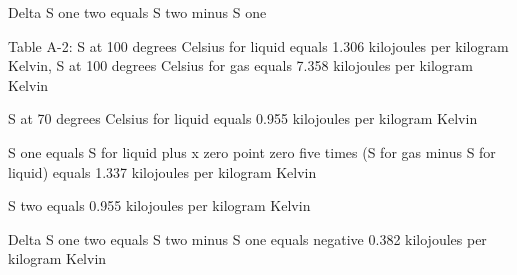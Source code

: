 Delta S one two equals S two minus S one  

Table A-2:  
S at 100 degrees Celsius for liquid equals 1.306 kilojoules per kilogram Kelvin, S at 100 degrees Celsius for gas equals 7.358 kilojoules per kilogram Kelvin  

S at 70 degrees Celsius for liquid equals 0.955 kilojoules per kilogram Kelvin  

S one equals S for liquid plus x zero point zero five times (S for gas minus S for liquid) equals 1.337 kilojoules per kilogram Kelvin  

S two equals 0.955 kilojoules per kilogram Kelvin  

Delta S one two equals S two minus S one equals negative 0.382 kilojoules per kilogram Kelvin